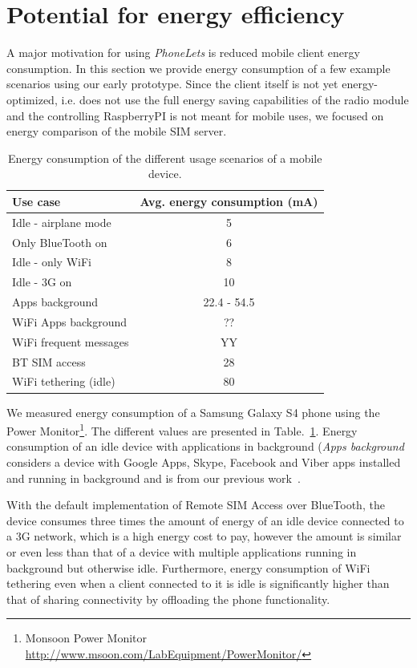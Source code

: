 \documentclass{sig-alternate-10pt}
\begin{document}
\section{Potential for energy efficiency}

A major motivation for using \emph{PhoneLets} is reduced mobile client energy consumption. In this section we provide energy consumption of a few example scenarios using our early prototype. Since the client itself is not yet energy-optimized, i.e. does not use the full energy saving capabilities of the radio module and the controlling RaspberryPI is not meant for mobile uses, we focused on energy comparison of the mobile SIM server.

\begin{table}[t]
{
\small
\begin{tabular}{| l | c |}
\hline
  \textbf{Use case}         & \textbf{Avg. energy consumption (mA)}  \\ \hline
  Idle - airplane mode      & 5  \\ \hline
  Only BlueTooth on         & 6  \\ \hline
  Idle - only WiFi          & 8  \\ \hline
  Idle - 3G on              & 10 \\ \hline
  Apps background           & 22.4 - 54.5  \\ \hline
  WiFi Apps background      & ??    \\ \hline
  WiFi frequent messages    & YY    \\ \hline
  BT SIM access             & 28  \\ \hline
  WiFi tethering (idle)     & 80  \\ \hline
\end{tabular}
}
\caption{Energy consumption of the different usage scenarios of a mobile device.}
\label{tab:energy}
\end{table}

We measured energy consumption of a Samsung Galaxy S4 phone using the Power Monitor\footnote{Monsoon Power Monitor \url{http://www.msoon.com/LabEquipment/PowerMonitor/}}. The different values are presented in Table.~\ref{tab:energy}. Energy consumption of an idle device with applications in background (\emph{Apps background} considers a device with Google Apps, Skype, Facebook and Viber apps installed and running in background and is from our previous work~\cite{Aucinas:2013uk}.

With the default implementation of Remote SIM Access over BlueTooth, the device consumes three times the amount of energy of an idle device connected to a 3G network, which is a high energy cost to pay, however the amount is similar or even less than that of a device with multiple applications running in background but otherwise idle. Furthermore, energy consumption of WiFi tethering even when a client connected to it is idle is significantly higher than that of sharing connectivity by offloading the phone functionality.
\end{document}
